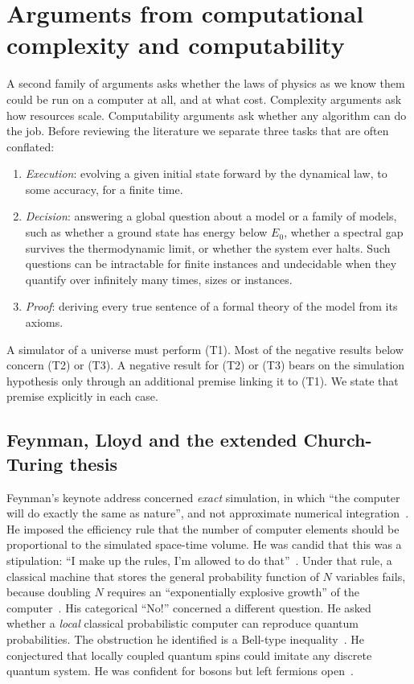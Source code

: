 \section{Arguments from computational complexity and computability}
\label{sec:complexity}

A second family of arguments asks whether the laws of physics as we know them
could be run on a computer at all, and at what cost. Complexity arguments ask
how resources scale. Computability arguments ask whether any algorithm can do
the job. Before reviewing the literature we separate three tasks that are often
conflated:
\begin{enumerate}
\item[(T1)] \emph{Execution}: evolving a given initial state forward by the
  dynamical law, to some accuracy, for a finite time.
\item[(T2)] \emph{Decision}: answering a global question about a model or a
  family of models, such as whether a ground state has energy below $E_0$,
  whether a spectral gap survives the thermodynamic limit, or whether the
  system ever halts. Such questions can be intractable for finite instances and
  undecidable when they quantify over infinitely many times, sizes or
  instances.
\item[(T3)] \emph{Proof}: deriving every true sentence of a formal theory of
  the model from its axioms.
\end{enumerate}
A simulator of a universe must perform (T1). Most of the negative results below
concern (T2) or (T3). A negative result for (T2) or (T3) bears on the
simulation hypothesis only through an additional premise linking it to (T1). We
state that premise explicitly in each case.

\subsection{Feynman, Lloyd and the extended Church-Turing thesis}
\label{sec:complexity:feynman}

Feynman's keynote address concerned \emph{exact} simulation, in which ``the
computer will do exactly the same as nature'', and not approximate numerical
integration~\cite{Feynman1982simulating}. He imposed the efficiency rule that the number of computer elements should be proportional to
the simulated space-time volume. He was candid that this was a stipulation:
``I make up the rules, I'm allowed to do that''~\cite[p.~469]{Feynman1982simulating}.
Under that rule, a classical machine that stores the general probability
function of $N$ variables fails, because doubling $N$ requires an
``exponentially explosive growth'' of the computer~\cite[p.~472]{Feynman1982simulating}.
His categorical ``No!'' concerned a different question. He asked whether a
\emph{local} classical probabilistic computer can reproduce quantum
probabilities. The obstruction he identified is a Bell-type
inequality~\cite[pp.~476, 485]{Feynman1982simulating}. He conjectured that
locally coupled quantum spins could imitate any discrete quantum system. He
was confident for bosons but left fermions open~\cite[p.~476]{Feynman1982simulating}.

